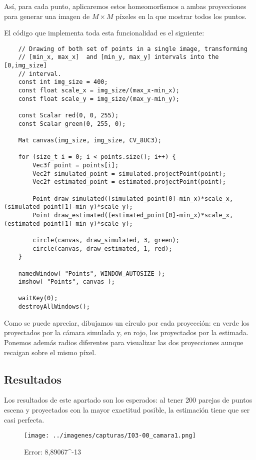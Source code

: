 \documentclass[a4paper, 11pt]{article}
\theoremstyle{definition}
\theoremstyle{theorem}
\begin{document}
    Así, para cada punto, aplicaremos estos homeomorfismos a ambas proyecciones para generar una imagen de $M \times M$ píxeles en la que mostrar todos los puntos.

    El código que implementa toda esta funcionalidad es el siguiente:

    \begin{lstlisting}
    // Drawing of both set of points in a single image, transforming
    // [min_x, max_x]  and [min_y, max_y] intervals into the [0,img_size]
    // interval.
    const int img_size = 400;
    const float scale_x = img_size/(max_x-min_x);
    const float scale_y = img_size/(max_y-min_y);

    const Scalar red(0, 0, 255);
    const Scalar green(0, 255, 0);

    Mat canvas(img_size, img_size, CV_8UC3);

    for (size_t i = 0; i < points.size(); i++) {
        Vec3f point = points[i];
        Vec2f simulated_point = simulated.projectPoint(point);
        Vec2f estimated_point = estimated.projectPoint(point);

        Point draw_simulated((simulated_point[0]-min_x)*scale_x, (simulated_point[1]-min_y)*scale_y);
        Point draw_estimated((estimated_point[0]-min_x)*scale_x, (estimated_point[1]-min_y)*scale_y);

        circle(canvas, draw_simulated, 3, green);
        circle(canvas, draw_estimated, 1, red);
    }

    namedWindow( "Points", WINDOW_AUTOSIZE );
    imshow( "Points", canvas );

    waitKey(0);
    destroyAllWindows();
    \end{lstlisting}

    Como se puede apreciar, dibujamos un círculo por cada proyección: en verde los proyectados por la cámara simulada y, en rojo, los proyectados por la estimada. Ponemos además radios diferentes para visualizar las dos proyecciones aunque recaigan sobre el mismo píxel.

    \subsection{Resultados}
    Los resultados de este apartado son los esperados: al tener 200 parejas de puntos escena y proyectados con la mayor exactitud posible, la estimación tiene que ser casi perfecta.

    \begin{figure}[htb!]
        \centering
        \texttt{[image: ../imagenes/capturas/I03-00\_camara1.png]}
        \caption{Error: 8,89067^{-13} \label{camara1}}
    \end{figure}
\end{document}
